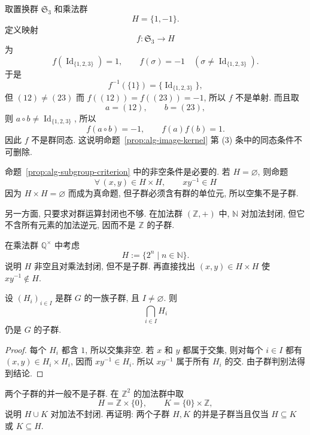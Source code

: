 \documentclass[usesamecnt, thmcnt=section, lang=cn, newtx, 10pt, scheme=chinese]{elegantbook}
\begin{document}
\begin{instance}
取置换群 $\mathfrak S_3$ 和乘法群
\[
 H=\{1,-1\}.
\]
定义映射
\[
 f:\mathfrak S_3\longrightarrow H
\]
为
\[
 f(\operatorname{Id}_{\{1,2,3\}})=1,
 \qquad
 f(\sigma)=-1\quad(\sigma\neq\operatorname{Id}_{\{1,2,3\}}).
\]
于是
\[
 f^{-1}(\{1\})=\{\operatorname{Id}_{\{1,2,3\}}\},
\]
但 $(12)\neq(23)$ 而 $f((12))=f((23))=-1$, 所以 $f$ 不是单射. 而且取
\[
 a=(12),\qquad b=(23),
\]
则 $a\circ b\neq \operatorname{Id}_{\{1,2,3\}}$, 所以
\[
 f(a\circ b)=-1,
 \qquad
 f(a)f(b)=1.
\]
因此 $f$ 不是群同态. 这说明命题~\ref{prop:alg-image-kernel} 第 (3) 条中的同态条件不可删除.
\end{instance}

\begin{instance}
命题~\ref{prop:alg-subgroup-criterion} 中的非空条件是必要的. 若 $H=\varnothing$, 则命题
\[
 \forall\,(x,y)\in H\times H,\qquad xy^{-1}\in H
\]
因为 $H\times H=\varnothing$ 而成为真命题, 但子群必须含有群的单位元, 所以空集不是子群.

另一方面, 只要求对群运算封闭也不够. 在加法群 $(\mathbb Z,+)$ 中, $\mathbb N$ 对加法封闭, 但它不含所有元素的加法逆元, 因而不是 $\mathbb Z$ 的子群.
\end{instance}

\begin{exercise}\label{ex:alg-subgroup-nonempty}
在乘法群 $\mathbb Q^\times$ 中考虑
\[
 H:=\{2^n\mid n\in\mathbb N\}.
\]
说明 $H$ 非空且对乘法封闭, 但不是子群. 再直接找出 $(x,y)\in H\times H$ 使 $xy^{-1}\notin H$.
\end{exercise}

\begin{proposition}\label{prop:alg-subgroup-intersection}
设 $(H_i)_{i\in I}$ 是群 $G$ 的一族子群, 且 $I\neq\varnothing$. 则
\[
 \bigcap_{i\in I}H_i
\]
仍是 $G$ 的子群.
\end{proposition}

\begin{proof}
每个 $H_i$ 都含 $1$, 所以交集非空. 若 $x$ 和 $y$ 都属于交集, 则对每个 $i\in I$ 都有 $(x,y)\in H_i\times H_i$, 因而 $xy^{-1}\in H_i$. 所以 $xy^{-1}$ 属于所有 $H_i$ 的交. 由子群判别法得到结论.
\end{proof}

\begin{exercise}\label{ex:alg-subgroup-union}
两个子群的并一般不是子群. 在 $\mathbb Z^2$ 的加法群中取
\[
 H=\mathbb Z\times\{0\},\qquad K=\{0\}\times\mathbb Z,
\]
说明 $H\cup K$ 对加法不封闭. 再证明: 两个子群 $H,K$ 的并是子群当且仅当 $H\subseteq K$ 或 $K\subseteq H$.
\end{exercise}
\end{document}
